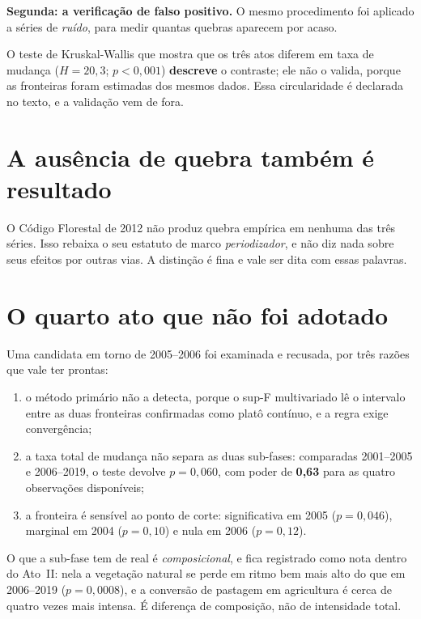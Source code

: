 \textbf{Segunda: a verificação de falso positivo.} O mesmo procedimento foi
aplicado a séries de \emph{ruído}, para medir quantas quebras aparecem por
acaso.

\begin{naodiz}
O teste de Kruskal-Wallis que mostra que os três atos diferem em taxa de mudança
($H = 20{,}3$; $p < 0{,}001$) \textbf{descreve} o contraste; ele não o valida,
porque as fronteiras foram estimadas dos mesmos dados. Essa circularidade é
declarada no texto, e a validação vem de fora.
\end{naodiz}

\section{A ausência de quebra também é resultado}

O Código Florestal de 2012 não produz quebra empírica em nenhuma das três
séries. Isso rebaixa o seu estatuto de marco \emph{periodizador}, e não diz
nada sobre seus efeitos por outras vias. A distinção é fina e vale ser dita com
essas palavras.

\section{O quarto ato que não foi adotado}

Uma candidata em torno de 2005--2006 foi examinada e recusada, por três razões
que vale ter prontas:

\begin{enumerate}
\item o método primário não a detecta, porque o sup-F multivariado lê o
intervalo entre as duas fronteiras confirmadas como platô contínuo, e a regra
exige convergência;
\item a taxa total de mudança não separa as duas sub-fases: comparadas
2001--2005 e 2006--2019, o teste devolve $p = 0{,}060$, com poder de
\textbf{0,63} para as quatro observações disponíveis;
\item a fronteira é sensível ao ponto de corte: significativa em 2005
($p = 0{,}046$), marginal em 2004 ($p = 0{,}10$) e nula em 2006 ($p = 0{,}12$).
\end{enumerate}

O que a sub-fase tem de real é \emph{composicional}, e fica registrado como nota
dentro do Ato~II: nela a vegetação natural se perde em ritmo bem mais alto do
que em 2006--2019 ($p = 0{,}0008$), e a conversão de pastagem em agricultura é
cerca de quatro vezes mais intensa. É diferença de composição, não de
intensidade total.

